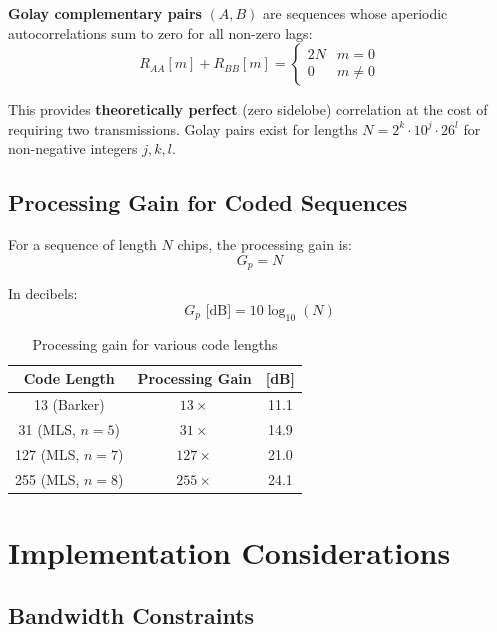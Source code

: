 \documentclass[11pt]{article}
\begin{document}
\textbf{Golay complementary pairs} $(A, B)$ are sequences whose aperiodic autocorrelations sum to zero for all non-zero lags:
\begin{equation}
R_{AA}[m] + R_{BB}[m] = \begin{cases}
2N & m = 0 \\
0 & m \neq 0
\end{cases}
\end{equation}

This provides \textbf{theoretically perfect} (zero sidelobe) correlation at the cost of requiring two transmissions. Golay pairs exist for lengths $N = 2^k \cdot 10^j \cdot 26^l$ for non-negative integers $j, k, l$.

\subsection{Processing Gain for Coded Sequences}

For a sequence of length $N$ chips, the processing gain is:
\begin{equation}
G_p = N
\end{equation}

In decibels:
\begin{equation}
G_p \text{ [dB]} = 10\log_{10}(N)
\end{equation}

\begin{table}[h]
\centering
\begin{tabular}{ccc}
\toprule
\textbf{Code Length} & \textbf{Processing Gain} & \textbf{[dB]} \\
\midrule
13 (Barker) & $13\times$ & 11.1 \\
31 (MLS, $n=5$) & $31\times$ & 14.9 \\
127 (MLS, $n=7$) & $127\times$ & 21.0 \\
255 (MLS, $n=8$) & $255\times$ & 24.1 \\
\bottomrule
\end{tabular}
\caption{Processing gain for various code lengths}
\end{table}

\section{Implementation Considerations}

\subsection{Bandwidth Constraints}
\end{document}
